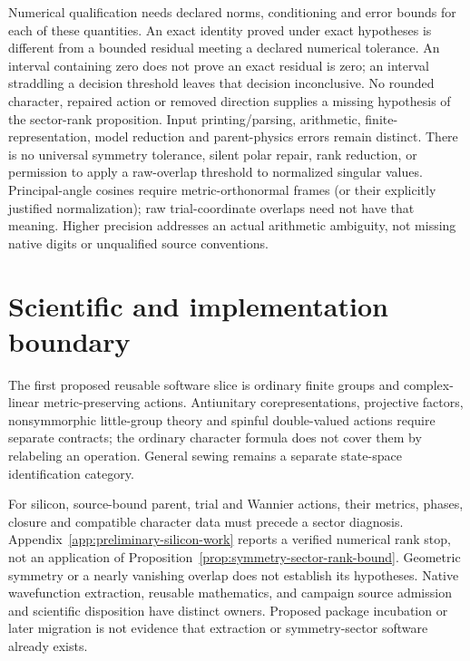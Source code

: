 Numerical qualification needs declared norms, conditioning and error bounds
for each of these quantities. An exact identity proved under exact hypotheses
is different from a bounded residual meeting a declared numerical tolerance.
An interval containing zero does not prove an exact residual is zero; an
interval straddling a decision threshold leaves that decision inconclusive.
No rounded character, repaired action or removed direction supplies a missing
hypothesis of the sector-rank proposition.
Input printing/parsing, arithmetic, finite-representation, model
reduction and parent-physics errors remain distinct. There is no universal
symmetry tolerance, silent polar repair, rank reduction, or permission to
apply a raw-overlap threshold to normalized singular values. Principal-angle
cosines require metric-orthonormal frames (or their explicitly justified
normalization); raw trial-coordinate overlaps need not have that meaning.
Higher precision addresses an actual arithmetic ambiguity, not missing native
digits or unqualified source conventions.

\section{Scientific and implementation boundary}

The first proposed reusable software slice is ordinary finite groups and
complex-linear metric-preserving actions. Antiunitary corepresentations,
projective factors, nonsymmorphic little-group theory and spinful double-valued
actions require separate contracts; the ordinary character formula does not
cover them by relabeling an operation. General sewing remains a separate
state-space identification category.

For silicon, source-bound parent, trial and Wannier actions, their metrics,
phases, closure and compatible character data must precede a sector diagnosis.
Appendix~\ref{app:preliminary-silicon-work} reports a verified numerical rank
stop, not an application of Proposition~\ref{prop:symmetry-sector-rank-bound}.
Geometric symmetry or a nearly vanishing overlap does not establish its
hypotheses. Native wavefunction extraction, reusable mathematics, and campaign
source admission and scientific disposition have distinct owners. Proposed
package incubation or later migration is not evidence that extraction or
symmetry-sector software already exists.
